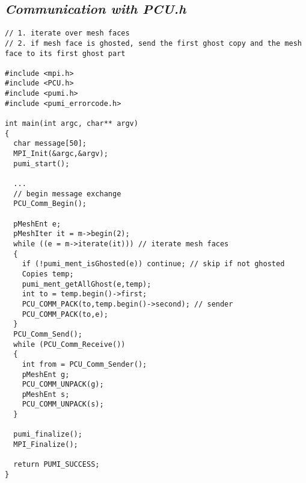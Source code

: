 \subsection{\textit{Communication with PCU.h}}

\begin{small}
\begin{verbatim}
// 1. iterate over mesh faces
// 2. if mesh face is ghosted, send the first ghost copy and the mesh face to its first ghost part

#include <mpi.h>
#include <PCU.h>
#include <pumi.h>
#include <pumi_errorcode.h>

int main(int argc, char** argv)
{
  char message[50];
  MPI_Init(&argc,&argv);
  pumi_start();

  ...
  // begin message exchange
  PCU_Comm_Begin();

  pMeshEnt e;
  pMeshIter it = m->begin(2); 
  while ((e = m->iterate(it))) // iterate mesh faces
  {
    if (!pumi_ment_isGhosted(e)) continue; // skip if not ghosted
    Copies temp;
    pumi_ment_getAllGhost(e,temp);
    int to = temp.begin()->first;
    PCU_COMM_PACK(to,temp.begin()->second); // sender
    PCU_COMM_PACK(to,e);
  }
  PCU_Comm_Send();
  while (PCU_Comm_Receive())
  {
    int from = PCU_Comm_Sender();
    pMeshEnt g;
    PCU_COMM_UNPACK(g);
    pMeshEnt s;
    PCU_COMM_UNPACK(s);
  }

  pumi_finalize();
  MPI_Finalize();

  return PUMI_SUCCESS;
}
\end{verbatim}
\end{small}

